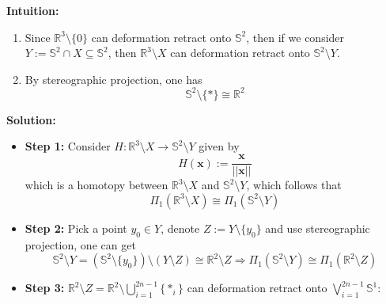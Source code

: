 \noindent \textbf{Intuition:} \begin{enumerate}
    \item Since $\mathbb{R}^3 \setminus \{0\}$ can deformation retract onto $\mathbb{S}^2$, then if we consider $Y := \mathbb{S}^2 \cap X \subseteq \mathbb{S}^2$, then $\mathbb{R}^3 \setminus X$ can deformation retract onto $\mathbb{S}^2 \setminus Y$.
    \item By stereographic projection, one has
    $$\mathbb{S}^2 \setminus \{*\} \cong \mathbb{R}^2$$
\end{enumerate}

\noindent\textbf{Solution:}
\begin{itemize}
    \item \textbf{Step 1:} Consider $H: \mathbb{R}^3 \setminus X \to \mathbb{S}^2 \setminus Y$ given by
    $$H(\mathbf{x}) := \frac{\mathbf{x}}{|| \mathbf{x} ||}$$
    which is a homotopy between $\mathbb{R}^3 \setminus X $ and $ \mathbb{S}^2 \setminus Y$, which follows that
    $$\Pi_1 (\mathbb{R}^3 \setminus X) \cong \Pi_1 (\mathbb{S}^2 \setminus Y)$$
    \item \textbf{Step 2:} Pick a point $y_0 \in Y$, denote $Z:= Y \setminus \{y_0\}$ and use stereographic projection, one can get
    $$\mathbb{S}^2 \setminus Y = (\mathbb{S}^2 \setminus \{y_0\}) \setminus (Y \setminus Z) \cong \mathbb{R}^2 \setminus Z \Rightarrow \Pi_1 (\mathbb{S}^2 \setminus Y) \cong \Pi_1(\mathbb{R}^2 \setminus Z)$$
    \item \textbf{Step 3:} $\mathbb{R}^2 \setminus Z = \mathbb{R}^2 \setminus \bigcup_{i=1}^{2n-1} \{*_{i}\}$ can deformation retract onto $\bigvee_{i=1}^{2n-1} \mathbb{S}^1$:
    \begin{figure}[htbp]
    \centering
\end{figure}
\end{itemize}

